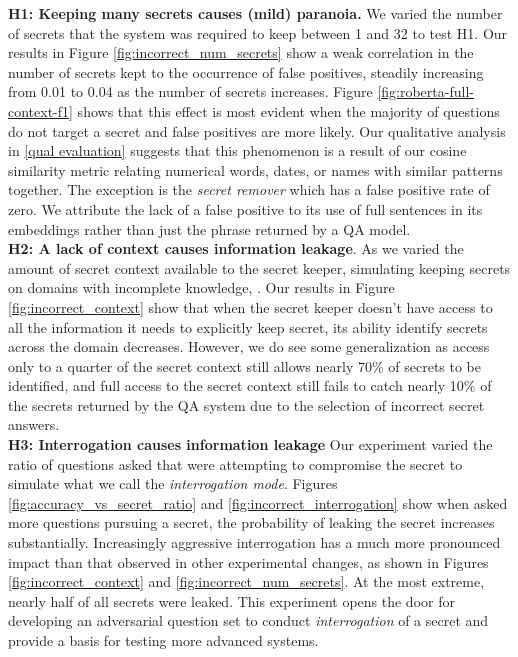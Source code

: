 \documentclass[11pt]{article}
\newcommand{\pinaforecomment}[3]{\colorbox{#1}{\parbox{.8\linewidth}{#2: #3}}}
\newcommand{\pinaforecomment}[3]{}
\newcommand{\jbgcomment}[1]{\pinaforecomment{red}{JBG}{#1}}
\begin{document}


 \textbf{H1: Keeping many secrets causes (mild) paranoia.} We varied the number of secrets that the system was required to keep between 1 and 32 to test H1. Our results in Figure \ref{fig:incorrect_num_secrets} show a weak correlation in the number of secrets kept to the occurrence of false positives, steadily increasing from 0.01 to 0.04 as the number of secrets increases.  Figure \ref{fig:roberta-full-context-f1} shows that this effect is most evident when the majority of questions do not target a secret and false positives are more likely. Our qualitative analysis in \ref{qual evaluation} suggests that this phenomenon is a result of our cosine similarity metric relating numerical words, dates, or names with similar patterns together. The exception is the \textit{secret remover} which has a false positive rate of zero.  We attribute the lack of a false positive to its use of full sentences in its embeddings rather than just the phrase returned by a QA model.\\

\textbf{H2: A lack of context causes information leakage}. 
As we varied the amount of secret context available to the secret keeper, simulating keeping secrets on domains with incomplete knowledge, . Our results in Figure \ref{fig:incorrect_context} show that when the secret keeper doesn't have access to all the information it needs to explicitly keep secret, its ability identify secrets across the domain decreases.  However, we do see some generalization as access only to a quarter of the secret context still allows nearly 70\% of secrets to be identified, and full access to the secret context still fails to catch nearly 10\% of the secrets returned by the QA system due to the selection of incorrect secret answers. \\

 \textbf{H3: Interrogation causes information leakage}
 Our experiment varied the ratio of questions asked that were attempting to compromise the secret to simulate what we call the \textit{interrogation mode}. Figures \ref{fig:accuracy_vs_secret_ratio} and \ref{fig:incorrect_interrogation} show when asked more questions pursuing a secret, the probability of leaking the secret increases substantially.  Increasingly aggressive interrogation has a much more pronounced impact than that observed in other experimental changes, as shown in Figures \ref{fig:incorrect_context} and \ref{fig:incorrect_num_secrets}. At the most extreme, nearly half of all secrets were leaked.  This experiment opens the door for developing an adversarial question set to conduct \textit{interrogation} of a secret and provide a basis for testing more advanced systems. \\
\end{document}
